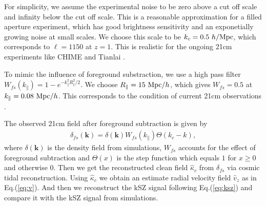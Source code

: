 For simplicity, we assume the experimental
noise to be zero above a cut off scale and infinity below the cut off scale.
This is a reasonable approximation for a filled aperture experiment, which
has good brightness sensitivity and an exponetially growing noise at small 
scales.
We choose this scale to be $k_c=0.5\ h/\mr{Mpc}$, which corresponds
to $\ell=1150$ at $z=1$. This is realistic for the ongoing 21cm experiments like
CHIME \cite{2014SPIE.9145E..22B}\cite{2014SPIE.9145E..4VN}
and Tianlai \cite{2012IJMPS..12..256C}\cite{2015ApJ...798...40X}.

To mimic the influence of foreground substraction, we use a high pass filter 
$W_{fs}(k_\parallel)=1-e^{-k_\parallel^2R_\parallel^2/2}$. We choose 
$R_\parallel=15\ \mathrm{Mpc}/h$, which gives
$W_{fs}=0.5$ at
$k_\parallel=0.08\ \mathrm{Mpc}/h$.
This corresponds to the condition of current 21cm observations  
\cite{2013ApJ...763L..20M}\cite{2013MNRAS.434L..46S}.

The observed 21cm field after foreground subtraction is given by 
\begin{eqnarray}
\delta_{fs}(\bm{k})=\delta(\bm{k})W_{fs}(k_\parallel)\Theta(k_c-k),
\end{eqnarray}
where $\delta(\bm{k})$ is the density field from simulations, $W_{fs}$ accounts for 
the effect of foreground subtraction and $\Theta(x)$ is the step function 
which equals $1$ for $x\ge0$ and otherwise $0$.
Then we get the reconstructed clean field $\hat \kappa_c$ from $\delta_{fs}$ via
cosmic tidal reconstruction. 
Using $\hat \kappa_c$ we obtain an estimate radial velocity field $\hat v_z$ as in Eq.(\ref{eq:v}).
And then we reconstruct the kSZ signal following Eq.(\ref{eq:ksz}) and compare it with the kSZ signal from simulations.

